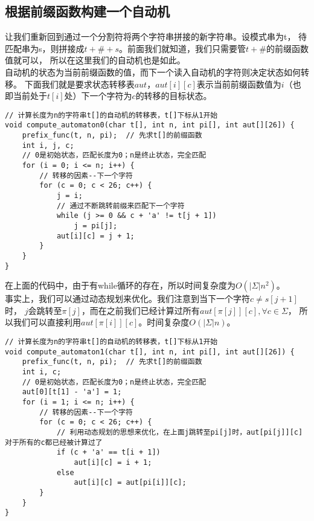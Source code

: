     \subsection{根据前缀函数构建一个自动机}
        让我们重新回到通过一个分割符将两个字符串拼接的新字符串。设模式串为t，
        待匹配串为s，则拼接成$t+\#+s$。前面我们就知道，我们只需要管$t+\#$的前缀函数值就可以，
        所以在这里我们的自动机也是如此。\\
        自动机的状态为当前前缀函数的值，而下一个读入自动机的字符则决定状态如何转移。
        下面我们就是要求状态转移表$aut$，$aut[i][c]$表示当前前缀函数值为$i$（也
        即当前处于$t[i]$处）下一个字符为$c$的转移的目标状态。
        \begin{lstlisting}
// 计算长度为n的字符串t[]的自动机的转移表，t[]下标从1开始
void compute_automaton0(char t[], int n, int pi[], int aut[][26]) {
    prefix_func(t, n, pi);  // 先求t[]的前缀函数
    int i, j, c;
    // 0是初始状态，匹配长度为0；n是终止状态，完全匹配
    for (i = 0; i <= n; i++) {
        // 转移的因素--下一个字符
        for (c = 0; c < 26; c++) {
            j = i;
            // 通过不断跳转前缀来匹配下一个字符
            while (j >= 0 && c + 'a' != t[j + 1])
                j = pi[j];
            aut[i][c] = j + 1;
        }
    }
}
        \end{lstlisting}
        在上面的代码中，由于有while循环的存在，所以时间复杂度为$O(|\Sigma|n^2)$。\\
        事实上，我们可以通过动态规划来优化。我们注意到当下一个字符$c \neq s[j+1]$时，
        $j$会跳转至$\pi[j]$，而在之前我们已经计算过所有$aut[\pi[j]][c],\forall c \in \Sigma$，
        所以我们可以直接利用$aut[\pi[i]][c]$。时间复杂度$O(|\Sigma|n)$。
        \begin{lstlisting}
// 计算长度为n的字符串t[]的自动机的转移表，t[]下标从1开始
void compute_automaton1(char t[], int n, int pi[], int aut[][26]) {
    prefix_func(t, n, pi);  // 先求t[]的前缀函数
    int i, c;
    // 0是初始状态，匹配长度为0；n是终止状态，完全匹配
    aut[0][t[1] - 'a'] = 1;
    for (i = 1; i <= n; i++) {
        // 转移的因素--下一个字符
        for (c = 0; c < 26; c++) {
            // 利用动态规划的思想来优化，在上面j跳转至pi[j]时，aut[pi[j]][c]对于所有的c都已经被计算过了
            if (c + 'a' == t[i + 1])
                aut[i][c] = i + 1;
            else
                aut[i][c] = aut[pi[i]][c];
        }
    }
}
        \end{lstlisting}
